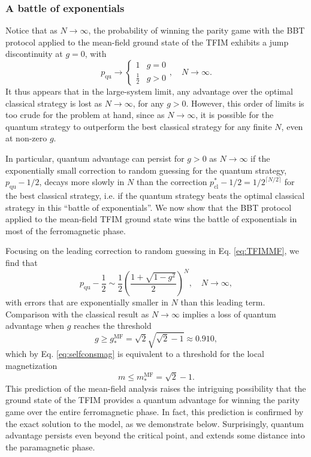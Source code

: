 \documentclass[prb,twocolumn,showpacs,amssymb,superscriptaddress]{revtex4-2}
\begin{document}
\subsubsection{A battle of exponentials}
\label{sec:boe}
Notice that as $N\to \infty$, the probability of winning the parity game with the BBT protocol applied to the mean-field ground state of the TFIM exhibits a jump discontinuity at $g=0$, with
\begin{equation}
\label{eq:jump}
p_{\mathrm{qu}} \to
\begin{cases} 1 & g=0 \\  \frac{1}{2} & g >0 \end{cases}, \quad N \to \infty.
\end{equation}
It thus appears that in the large-system limit, any advantage over the optimal classical strategy is lost as $N \to \infty$, for any $g>0$. However, this order of limits is too crude for the problem at hand, since as $N \to \infty$, it is possible for the quantum strategy to outperform the best classical strategy for any finite $N$, even at non-zero $g$. 

In particular, quantum advantage can persist for $g>0$ as $N \to \infty$ if the exponentially small correction to random guessing for the quantum strategy,
$p_{\mathrm{qu}}-1/2$, decays more slowly in $N$ than the correction $p_{\mathrm{cl}}^*-1/2 = 1/2^{\lceil N/2\rceil}$ for the best classical strategy, i.e. if the quantum strategy beats the optimal classical strategy in this ``battle of exponentials''. We now show that the BBT protocol applied to the mean-field TFIM ground state wins the battle of exponentials in most of the ferromagnetic phase.

Focusing on the leading correction to random guessing in Eq. \eqref{eq:TFIMMF}, we find that
\begin{equation}
p_{\mathrm{qu}} - \frac{1}{2} \sim  \frac{1}{2}\left(\frac{1+\sqrt{1-g^2}}{2}\right)^N, \quad N \to \infty,
\end{equation}
with errors that are exponentially smaller in $N$ than this leading term. Comparison with the classical result as $N \to \infty$ implies a loss of quantum advantage when $g$ reaches the threshold 
\begin{equation}
g \geq g^{\mathrm{MF}}_* = \sqrt{2}{\sqrt{\sqrt{2}-1}} \approx 0.910,
\end{equation}
which by Eq. \eqref{eq:selfconsmag} is equivalent to a threshold for the local magnetization
\begin{equation}
\label{eq:MFmagcondition}
m \leq m^{\mathrm{MF}}_* = \sqrt{2}-1.
\end{equation}
This prediction of the mean-field analysis raises the intriguing possibility that the ground state of the TFIM provides a quantum advantage for winning the parity game over the entire ferromagnetic phase. In fact, this prediction is confirmed by the exact solution to the model, as we demonstrate below. Surprisingly, quantum advantage persists even beyond the critical point, and extends some distance into the paramagnetic phase.
\end{document}

